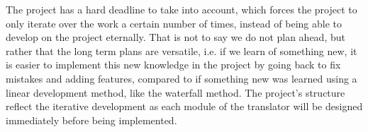 The project has a hard deadline to take into account, which forces the project to only iterate over the work a certain number of times, instead of being able to develop on the project eternally.
That is not to say we do not plan ahead, but rather that the long term plans are versatile, i.e. if we learn of something new, it is easier to implement this new knowledge in the project by going back to fix mistakes and adding features, compared to if something new was learned using a linear development method, like the waterfall method.
The project's structure reflect the iterative development as each module of the translator will be designed immediately before being implemented. 
